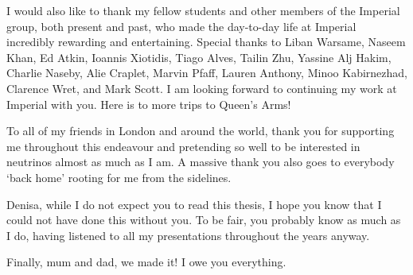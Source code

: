 \begin{acknowledgements}
I would also like to thank my fellow students and other members of the Imperial group, both present and past, who made the day-to-day life at Imperial incredibly rewarding and entertaining. Special thanks to Liban Warsame, Naseem Khan, Ed Atkin, Ioannis Xiotidis, Tiago Alves, Tailin Zhu, Yassine Alj Hakim, Charlie Naseby, Alie Craplet, Marvin Pfaff, Lauren Anthony, Minoo Kabirnezhad, Clarence Wret, and Mark Scott. I am looking forward to continuing my work at Imperial with you. Here is to more trips to Queen's Arms!

To all of my friends in London and around the world, thank you for supporting me throughout this endeavour and pretending so well to be interested in neutrinos almost as much as I am. A massive thank you also goes to everybody `back home' rooting for me from the sidelines.

Denisa, while I do not expect you to read this thesis, I hope you know that I could not have done this without you. To be fair, you probably know as much as I do, having listened to all my presentations throughout the years anyway.

Finally, mum and dad, we made it! I owe you everything.



\end{acknowledgements}